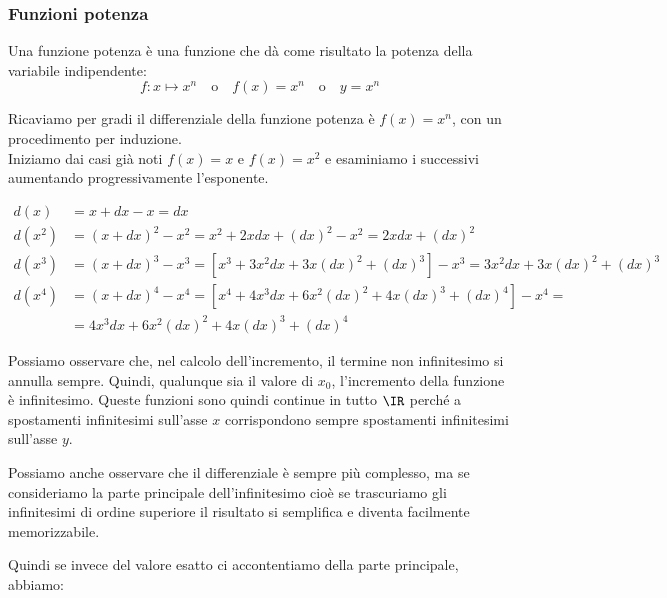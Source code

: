 \subsubsection{Funzioni potenza}
\label{subsubsec:diff01_diffpot}

Una funzione potenza è una funzione che dà come risultato la potenza 
della variabile indipendente:
\[f: x \mapsto x^n \quad \text{o} \quad 
  f(x)=x^n \quad \text{o} \quad 
  y = x^n\]

Ricaviamo per gradi il differenziale della funzione potenza è $f(x)=x^n$, 
con un procedimento per induzione.\\
Iniziamo dai casi già noti $f(x)=x$ e $f(x)=x^2$ e esaminiamo i successivi
aumentando progressivamente l'esponente.

\begin{align*}
  d(x) &=x+dx-x =dx\\
  d(x^2) &=(x+dx)^2-x^2 = x^2 +2xdx +(dx)^2 -x^2 = 2xdx +(dx)^2\\
  d(x^3) &=(x+dx)^3-x^3 =[x^3+3x^2dx+3x(dx)^2+(dx)^3]-x^3=
                      3x^2dx+3x(dx)^2+(dx)^3\\
  d(x^4) &=(x+dx)^4-x^4 = [x^4+4x^3dx+6x^2(dx)^2+4x(dx)^3+(dx)^4]-x^4=\\
                      &=4x^3dx+6x^2(dx)^2+4x(dx)^3+(dx)^4      
\end{align*}

Possiamo osservare che, nel calcolo dell'incremento, il termine non 
infinitesimo si annulla sempre. Quindi, qualunque sia il valore di \(x_0\), 
l'incremento della funzione è infinitesimo. 
Queste funzioni sono quindi continue in tutto \(\IR\) perché a spostamenti 
infinitesimi sull'asse \(x\) corrispondono sempre spostamenti infinitesimi 
sull'asse \(y\).

Possiamo anche osservare che il differenziale è sempre più complesso, ma 
se consideriamo la parte principale dell'infinitesimo cioè se trascuriamo 
gli infinitesimi di ordine superiore il risultato si semplifica e diventa 
facilmente memorizzabile.

Quindi se invece del valore esatto ci accontentiamo della parte principale, 
abbiamo:

